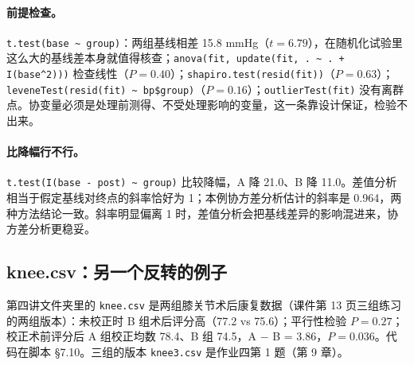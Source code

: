 \paragraph{前提检查。}\Verb|t.test(base ~ group)|：两组基线相差 15.8 mmHg（$t=6.79$），在随机化试验里这么大的基线差本身就值得核查；\Verb|anova(fit, update(fit, . ~ . + I(base^2)))| 检查线性（$P=0.40$）；\Verb|shapiro.test(resid(fit))|（$P=0.63$）；\Verb|leveneTest(resid(fit) ~ bp$group)|（$P=0.16$）；\Verb|outlierTest(fit)| 没有离群点。协变量必须是处理前测得、不受处理影响的变量，这一条靠设计保证，检验不出来。

\paragraph{比降幅行不行。}\Verb|t.test(I(base - post) ~ group)| 比较降幅，A 降 21.0、B 降 11.0。差值分析相当于假定基线对终点的斜率恰好为 1；本例协方差分析估计的斜率是 0.964，两种方法结论一致。斜率明显偏离 1 时，差值分析会把基线差异的影响混进来，协方差分析更稳妥。

\subsection{knee.csv：另一个反转的例子}
第四讲文件夹里的 \Verb|knee.csv| 是两组膝关节术后康复数据（课件第 13 页三组练习的两组版本）：未校正时 B 组术后评分高（77.2 vs 75.6）；平行性检验 $P=0.27$；校正术前评分后 A 组校正均数 78.4、B 组 74.5，A − B = 3.86，$P=0.036$。代码在脚本 §7.10。三组的版本 \Verb|knee3.csv| 是作业四第 1 题（第 9 章）。
